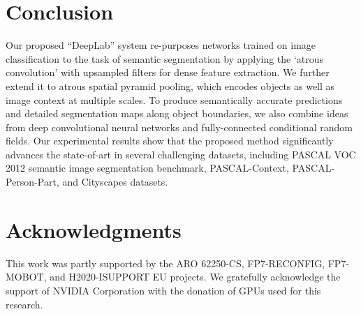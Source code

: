 \section{Conclusion}
Our proposed ``DeepLab'' system re-purposes networks trained
on image classification to the task of semantic segmentation by applying the `atrous convolution' with upsampled filters for dense feature extraction. We further extend it to atrous spatial pyramid pooling, which encodes objects as well as image context at multiple scales. To produce semantically accurate predictions and detailed segmentation maps along object boundaries, we also combine ideas from deep convolutional neural networks and fully-connected conditional random fields. Our experimental results show that the
proposed method significantly advances the state-of-art in several challenging
datasets, including PASCAL VOC 2012 semantic image segmentation benchmark, PASCAL-Context, PASCAL-Person-Part, and Cityscapes datasets.

\section*{Acknowledgments}
This work was partly supported by the ARO 62250-CS, FP7-RECONFIG, FP7-MOBOT, and H2020-ISUPPORT EU projects. We gratefully acknowledge the support of NVIDIA Corporation with the donation of GPUs used for this research.

